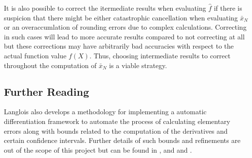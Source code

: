 \documentclass{standalone}
\begin{document}
	It is also possible to correct the itermediate results when evaluating $\hat{f}$ if there is suspicion that there might be either catastrophic cancellation when evaluating $\bar{x}_{N}$ or an overaccumlation of rounding errors due to complex calculations. Correcting in such cases will lead to more accurate results compared to not correcting at all but these corrections may have arbitrarily bad accuracies with respect to the actual function value $f(X)$. \cite{langlois2001automatic} Thus, choosing intermediate results to correct throughout the computation of $\bar{x}_{N}$ is a viable strategy. 
	\subsection{Further Reading}
	Langlois also develops a methodology for implementing a automatic differentiation framework to automate the process of calculating elementary errors along with bounds related to the computation of the derivatives and certain confidence intervals. Further details of such bounds and refinements are out of the scope of this project but can be found in \cite{langlois2001automatic}, \cite{langlois2005solving} and \cite{graillat2009algorithms} and \cite{langlois2007ensure}.
\end{document}

